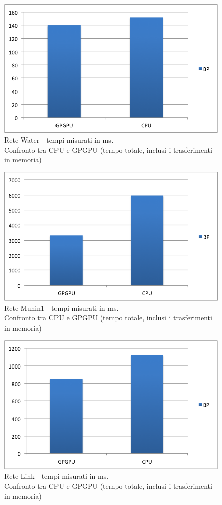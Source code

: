 \documentclass[a4paper]{article}   %
\begin{document}
\begin{figure}[p]
\centering
\includegraphics[scale=0.8]{WaterTOT.png}
\caption{Rete Water - tempi misurati in ms.\\Confronto tra CPU e GPGPU (tempo totale, inclusi i trasferimenti in memoria)} 
\label{graficoWater}
\end{figure}

\begin{figure}[p]
\centering
\includegraphics[scale=0.8]{Munin1TOT.png}
\caption{Rete Munin1 - tempi misurati in ms.\\Confronto tra CPU e GPGPU (tempo totale, inclusi i trasferimenti in memoria)} 
\label{graficoMunin1}
\end{figure}

\begin{figure}[p]
\centering
\includegraphics[scale=0.8]{LinkTOT.png}
\caption{Rete Link - tempi misurati in ms.\\Confronto tra CPU e GPGPU (tempo totale, inclusi i trasferimenti in memoria)} 
\label{graficoLink}
\end{figure}

\printbibliography
\end{document}
